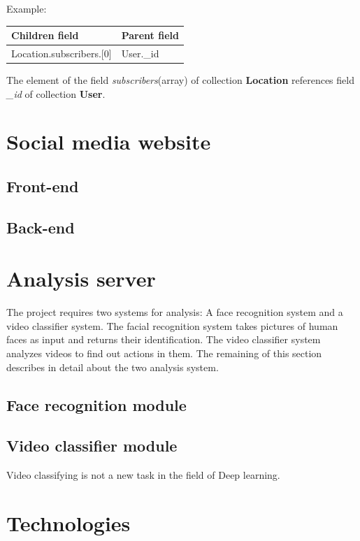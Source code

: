 \cleardoublepage
Example:
\begin{table}[H]
\begin{tabular}{|l|l|}
\hline
Children field               & Parent field \\ \hline
Location.subscribers.{[}0{]} & User.\_id    \\ \hline
\end{tabular}
\end{table}
The element of the field \textit{subscribers}(array) of collection \textbf{Location} references field \textit{\_id} of collection \textbf{User}.
\section{Social media website}
\subsection{Front-end}
\subsection{Back-end}
\section{Analysis server}
The project requires two systems for analysis: A face recognition system and a video classifier system. The facial recognition system takes pictures of human faces as input and returns their identification. The video classifier system analyzes videos to find out actions in them. The remaining of this section describes in detail about the two analysis system.
\subsection{Face recognition module}
\subsection{Video classifier module}
Video classifying is not a new task in the field of Deep learning.
	
\section{Technologies}

